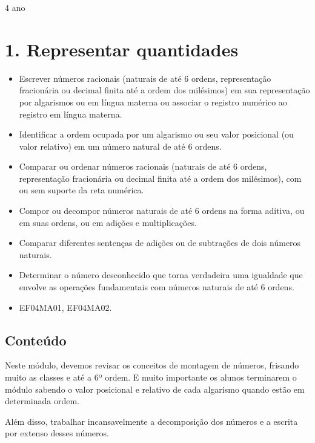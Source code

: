 \protect\hypertarget{_Hlk129432535}{}{}4 ano

\section{1. Representar quantidades}\label{muxf3dulo-1}


\begin{itemize}
\item Escrever números racionais (naturais de até 6 ordens, representação
fracionária ou decimal finita até a ordem dos milésimos) em sua
representação por algarismos ou em língua materna ou associar o registro
numérico ao registro em língua materna.
\item Identificar a ordem ocupada por um algarismo ou seu valor posicional
(ou valor relativo) em um número natural de até 6 ordens.
\item Comparar ou ordenar números racionais (naturais de até 6 ordens,
representação fracionária ou decimal finita até a ordem dos milésimos),
com ou sem suporte da reta numérica.
\item Compor ou decompor números naturais de até 6 ordens na forma aditiva,
ou em suas ordens, ou em adições e multiplicações.
\item Comparar diferentes sentenças de adições ou de subtrações de dois
números naturais.
\item Determinar o número desconhecido que torna verdadeira uma igualdade
que envolve as operações fundamentais com números naturais de até 6
ordens.
\end{itemize}


\begin{itemize}
\item EF04MA01, EF04MA02.
\end{itemize}

\subsection{Conteúdo}\label{conteuxfado}

Neste módulo, devemos revisar os conceitos de montagem de
números, frisando muito as classes e até a 6º ordem. E muito importante
os alunos terminarem o módulo sabendo o valor posicional e relativo de
cada algarismo quando estão em determinada ordem.

Além disso, trabalhar incansavelmente a decomposição dos números e a
escrita por extenso desses números.

